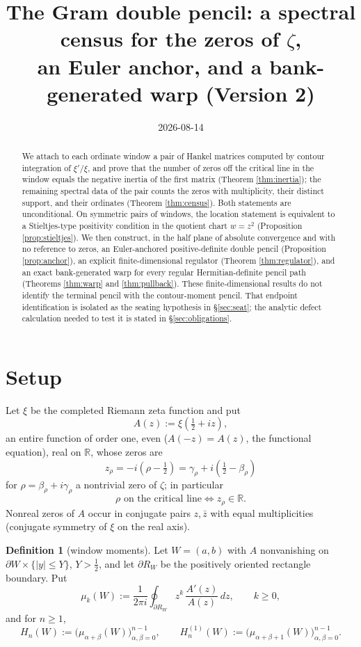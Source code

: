 \documentclass[11pt]{article}
\title{The Gram double pencil: a spectral census for the zeros of $\zeta$,\\
an Euler anchor, and a bank-generated warp (Version 2)}
\author{}
\date{2026-08-14}
\theoremstyle{plain}
\theoremstyle{definition}
\newtheorem{definition}[theorem]{Definition}
\theoremstyle{remark}
\newcommand{\R}{\mathbb{R}}
\begin{document}
\maketitle

\begin{abstract}
We attach to each ordinate window a pair of Hankel matrices computed by
contour integration of $\xi'/\xi$, and prove that the number of zeros off the critical
line in the window equals the negative inertia of the first matrix (Theorem
\ref{thm:inertia}); the remaining spectral data of the pair counts the zeros with
multiplicity, their distinct support, and their ordinates (Theorem \ref{thm:census}).
Both statements are unconditional. On symmetric pairs of windows, the location statement
is equivalent to a Stieltjes-type positivity condition in the quotient chart $w=z^2$
(Proposition \ref{prop:stieltjes}). We then construct,
in the half plane of absolute convergence and with no reference to zeros, an
Euler-anchored positive-definite double pencil (Proposition \ref{prop:anchor}), an
explicit finite-dimensional regulator (Theorem \ref{thm:regulator}), and an exact
bank-generated warp for every regular Hermitian-definite pencil path (Theorems
\ref{thm:warp} and \ref{thm:pullback}). These finite-dimensional results do not identify
the terminal pencil with the contour-moment pencil. That endpoint identification is
isolated as the seating hypothesis in \S\ref{sec:seat}; the analytic defect calculation
needed to test it is stated in \S\ref{sec:obligations}.
\end{abstract}

\section{Setup}

Let $\xi$ be the completed Riemann zeta function and put
\[
  A(z) := \xi\!\left(\tfrac12 + iz\right),
\]
an entire function of order one, even ($A(-z)=A(z)$, the functional equation), real on
$\R$, whose zeros are
\[
  z_\rho=-i\!\left(\rho-\tfrac12\right)
  =\gamma_\rho+i\!\left(\tfrac12-\beta_\rho\right)
\]
for
$\rho = \beta_\rho + i\gamma_\rho$ a nontrivial zero of $\zeta$; in particular
\[
  \rho \text{ on the critical line} \iff z_\rho \in \R .
\]
Nonreal zeros of $A$ occur in conjugate pairs $z,\bar z$ with equal multiplicities
(conjugate symmetry of $\xi$ on the real axis).

\begin{definition}[window moments]\label{def:moments}
Let $W=(a,b)$ with $A$ nonvanishing on $\partial W \times \{|y|\le Y\}$, $Y>\tfrac12$,
and let $\partial R_W$ be the positively oriented rectangle boundary. Put
\[
  \mu_k(W) := \frac{1}{2\pi i}\oint_{\partial R_W} z^k\,\frac{A'(z)}{A(z)}\,dz,
  \qquad k \ge 0,
\]
and for $n\ge 1$,
\[
  H_n(W) := \bigl(\mu_{\alpha+\beta}(W)\bigr)_{\alpha,\beta=0}^{n-1},
  \qquad
  H_n^{(1)}(W) := \bigl(\mu_{\alpha+\beta+1}(W)\bigr)_{\alpha,\beta=0}^{n-1}.
\]
\end{definition}
\end{document}
